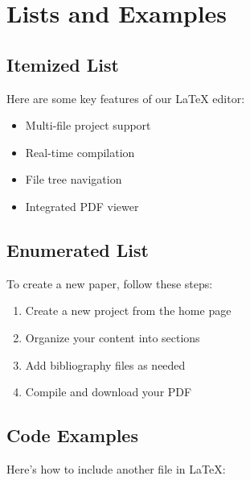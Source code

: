 \section{Lists and Examples}

\subsection{Itemized List}
Here are some key features of our LaTeX editor:
\begin{itemize}
    \item Multi-file project support
    \item Real-time compilation
    \item File tree navigation
    \item Integrated PDF viewer
\end{itemize}

\subsection{Enumerated List}
To create a new paper, follow these steps:
\begin{enumerate}
    \item Create a new project from the home page
    \item Organize your content into sections
    \item Add bibliography files as needed
    \item Compile and download your PDF
\end{enumerate}

\subsection{Code Examples}
Here's how to include another file in LaTeX:
\begin{verbatim}


\end{verbatim}